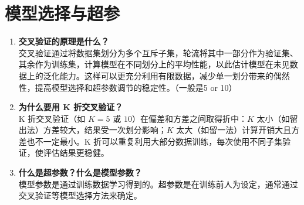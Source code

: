 \documentclass{article}
\begin{document}
\section{模型选择与超参}
\begin{enumerate}
\item \textbf{交叉验证的原理是什么？}\\
交叉验证通过将数据集划分为多个互斥子集，轮流将其中一部分作为验证集、其余作为训练集，计算模型在不同划分上的平均性能，以此估计模型在未见数据上的泛化能力。这样可以更充分利用有限数据，减少单一划分带来的偶然性，提高模型选择和超参数调节的稳定性。（一般是5 or 10）

\item \textbf{为什么要用 K 折交叉验证？}\\
K 折交叉验证（如 $K=5$ 或 $10$）在偏差和方差之间取得折中：$K$ 太小（如留出法）方差较大，结果受一次划分影响；$K$ 太大（如留一法）计算开销大且方差也不一定最小。K 折可以重复利用大部分数据训练，每次使用不同子集验证，使评估结果更稳健。

\item \textbf{什么是超参数？什么是模型参数？}\\
模型参数是通过训练数据学习得到的。超参数是在训练前人为设定，通常通过交叉验证等模型选择方法来确定。
\end{enumerate}
\end{document}
